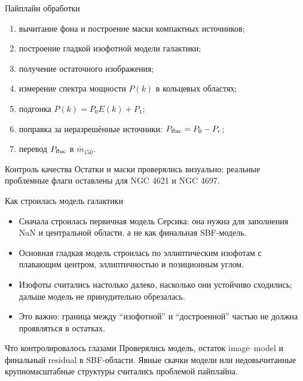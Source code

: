 \documentclass[aspectratio=169, 11pt]{beamer}
\begin{document}
\begin{frame}{Пайплайн обработки}
    \begin{enumerate}
        \item вычитание фона и построение маски компактных источников;
        \item построение гладкой изофотной модели галактики;
        \item получение остаточного изображения;
        \item измерение спектра мощности $P(k)$ в кольцевых областях;
        \item подгонка $P(k)=P_0E(k)+P_1$;
        \item поправка за неразрешённые источники: $P_{\rm fluc}=P_0-P_r$;
        \item перевод $P_{\rm fluc}$ в $\bar{m}_{150}$.
    \end{enumerate}
    \vspace{0.15cm}
    \begin{block}{Контроль качества}
        Остатки и маски проверялись визуально; реальные проблемные флаги оставлены для NGC 4621 и NGC 4697.
    \end{block}
\end{frame}

\begin{frame}{Как строилась модель галактики}
    \begin{itemize}
        \item Сначала строилась первичная модель Серсика: она нужна для заполнения NaN и центральной области, а не как финальная SBF-модель.
        \item Основная гладкая модель строилась по эллиптическим изофотам с плавающим центром, эллиптичностью и позиционным углом.
        \item Изофоты считались настолько далеко, насколько они устойчиво сходились; дальше модель не принудительно обрезалась.
        \item Это важно: граница между ``изофотной'' и ``достроенной'' частью не должна проявляться в остатках.
    \end{itemize}
    \begin{block}{Что контролировалось глазами}
        Проверялись модель, остаток image--model и финальный residual в SBF-области. Явные скачки модели или недовычитанные крупномасштабные структуры считались проблемой пайплайна.
    \end{block}
\end{frame}
\end{document}
